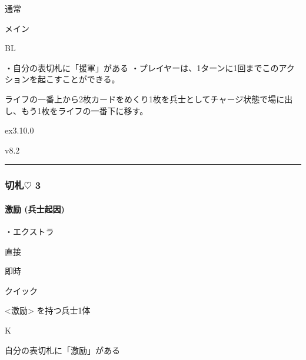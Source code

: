 \documentclass[letterpaper,10pt,dvipdfmx]{sphinxmanual}
\begin{document}
\sphinxAtStartPar
{} 通常

\sphinxAtStartPar
{} メイン

\sphinxAtStartPar
{} BL

\sphinxAtStartPar
{}

\sphinxAtStartPar
・自分の表切札に「援軍」がある
・プレイヤーは、1ターンに1回までこのアクションを起こすことができる。

\sphinxAtStartPar
{}

\sphinxAtStartPar
ライフの一番上から2枚カードをめくり1枚を兵士としてチャージ状態で場に出し、もう1枚をライフの一番下に移す。

\sphinxAtStartPar
{}  ex3.10.0

\sphinxAtStartPar
{}  v8.2


\bigskip\hrule\bigskip



\subsubsection{切札{\normalsize $\heartsuit$} 3}
\label{\detokenize{auto/frameActionlist:id35}}

\paragraph{激励 (兵士起因)}
\label{\detokenize{auto/frameActionlist:act-rally}}\label{\detokenize{auto/frameActionlist:id36}}
\sphinxAtStartPar
{}

\sphinxAtStartPar
・エクストラ

\sphinxAtStartPar
{} 直接

\sphinxAtStartPar
{} 即時

\sphinxAtStartPar
{} クイック

\sphinxAtStartPar
{} \textless{}激励\textgreater{} を持つ兵士1体

\sphinxAtStartPar
{} K

\sphinxAtStartPar
{}

\sphinxAtStartPar
自分の表切札に「激励」がある

\sphinxAtStartPar
{}
\end{document}
